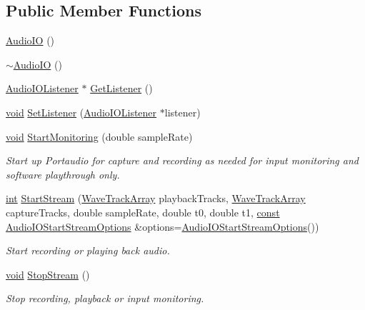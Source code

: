 \subsection*{Public Member Functions}
\begin{DoxyCompactItemize}
\item 
\hyperlink{class_audio_i_o_a68c6824c106711b4768dd3847a233366}{Audio\+IO} ()
\item 
\hyperlink{class_audio_i_o_a747b3a9f103ce40e9b8d5e8dfb1cfce2}{$\sim$\+Audio\+IO} ()
\item 
\hyperlink{class_audio_i_o_listener}{Audio\+I\+O\+Listener} $\ast$ \hyperlink{class_audio_i_o_a78477917ca8c9800ce6f5074a7044399}{Get\+Listener} ()
\item 
\hyperlink{sound_8c_ae35f5844602719cf66324f4de2a658b3}{void} \hyperlink{class_audio_i_o_a8d9df4aba253fa43612ac02bafa994fd}{Set\+Listener} (\hyperlink{class_audio_i_o_listener}{Audio\+I\+O\+Listener} $\ast$listener)
\item 
\hyperlink{sound_8c_ae35f5844602719cf66324f4de2a658b3}{void} \hyperlink{class_audio_i_o_a447c4b556a0f66a61ead1c97ed4ae7e7}{Start\+Monitoring} (double sample\+Rate)
\begin{DoxyCompactList}\small\item\em Start up Portaudio for capture and recording as needed for input monitoring and software playthrough only. \end{DoxyCompactList}\item 
\hyperlink{xmltok_8h_a5a0d4a5641ce434f1d23533f2b2e6653}{int} \hyperlink{class_audio_i_o_ac2be97e813dfdedb3504b20f8b61cdd7}{Start\+Stream} (\hyperlink{class_wave_track_array}{Wave\+Track\+Array} playback\+Tracks, \hyperlink{class_wave_track_array}{Wave\+Track\+Array} capture\+Tracks, double sample\+Rate, double t0, double t1, \hyperlink{getopt1_8c_a2c212835823e3c54a8ab6d95c652660e}{const} \hyperlink{struct_audio_i_o_start_stream_options}{Audio\+I\+O\+Start\+Stream\+Options} \&options=\hyperlink{struct_audio_i_o_start_stream_options}{Audio\+I\+O\+Start\+Stream\+Options}())
\begin{DoxyCompactList}\small\item\em Start recording or playing back audio. \end{DoxyCompactList}\item 
\hyperlink{sound_8c_ae35f5844602719cf66324f4de2a658b3}{void} \hyperlink{class_audio_i_o_a018ef510a8616f1feeb0f542f82b1d44}{Stop\+Stream} ()
\begin{DoxyCompactList}\small\item\em Stop recording, playback or input monitoring. \end{DoxyCompactList}\item 

\end{DoxyCompactItemize}
